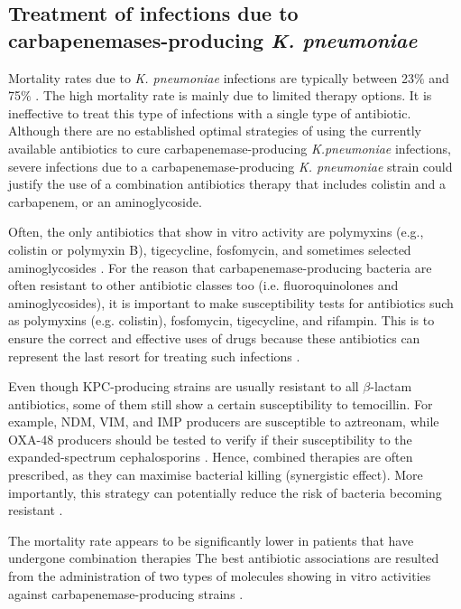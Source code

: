 \documentclass[11pt]{report}
\begin{document}
\subsection{Treatment of infections due to carbapenemases-producing \emph{K. pneumoniae}}
Mortality rates due to \emph{K. pneumoniae} infections are typically between 23$\%$ and 75$\%$ \cite{karaiskos2014multidrug}.
The high mortality rate is mainly due to limited therapy options. It is ineffective to treat this type of infections with a single type of antibiotic. Although there are no established optimal strategies of using the currently available antibiotics to cure carbapenemase-producing \emph{K.pneumoniae} infections, severe infections due to a carbapenemase-producing \emph{K. pneumoniae} strain could justify the use of a combination antibiotics therapy that includes colistin and a carbapenem, or an aminoglycoside.

Often, the only antibiotics that show in vitro activity are polymyxins (e.g., colistin or polymyxin B), tigecycline, fosfomycin, and sometimes selected aminoglycosides \cite{rodriguez2015diagnosis}.
For the reason that carbapenemase-producing bacteria are often resistant to other antibiotic classes too (i.e. fluoroquinolones and aminoglycosides), it is important to make susceptibility tests for antibiotics such as polymyxins (e.g. colistin), fosfomycin, tigecycline, and rifampin.
This is to ensure the correct and effective uses of drugs because these antibiotics can represent the last resort for treating such infections \cite{adams2009activity}.

Even though KPC-producing strains are usually resistant to all $\beta$-lactam antibiotics, some of them still show a certain susceptibility to temocillin.
For example, NDM, VIM, and IMP producers are susceptible to aztreonam, while OXA-48 producers should be tested to verify if their susceptibility to the expanded-spectrum cephalosporins \cite{girlich2009ctx}.
Hence, combined therapies are often prescribed, as they can maximise bacterial killing (synergistic effect).
More importantly, this strategy can potentially reduce the risk of bacteria becoming resistant \cite{Pitout2015}.

The mortality rate appears to be significantly lower in patients that have undergone combination therapies \cite{tzouvelekis2014treating, zavascki2013combination}
The best antibiotic associations are resulted from the administration of two types of molecules showing in vitro activities against carbapenemase-producing strains \cite{falagas2013antibiotic, tzouvelekis2014treating}.
\end{document}
